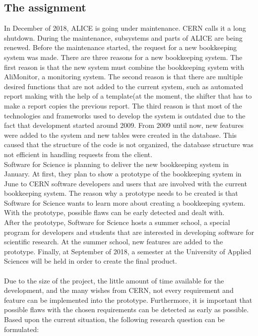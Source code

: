 \documentclass[paper=a4, fontsize=11pt,twoside]{scrartcl}	%
\begin{document}
\subsection{The assignment}
In December of 2018, ALICE is going under maintenance. CERN calls it a long shutdown. During the maintenance, subsystems and parts of ALICE are being renewed. Before the maintenance started, the request for a new bookkeeping system was made. There are three reasons for a new bookkeeping system. The first reason is that the new system must combine the bookkeeping system with AliMonitor, a monitoring system. The second reason is that there are multiple desired functions that are not added to the current system, such as automated report making with the help of a template(at the moment, the shifter that has to make a report copies the previous report. The third reason is that most of the technologies and frameworks used to develop the system is outdated due to the fact that development started around 2009. From 2009 until now, new features were added to the system and new tables were created in the database. This caused that the structure of the code is not organized, the database structure was not efficient in handling requests from the client. \\
Software for Science is planning to deliver the new bookkeeping system in January. At first, they plan to show a prototype of the bookkeeping system in June to CERN software developers and users that are involved with the current bookkeeping system. The reason why a prototype needs to be created is that Software for Science wants to learn more about creating a bookkeeping system. With the prototype, possible flaws can be early detected and dealt with. \\
After the prototype, Software for Science hosts a summer school, a special program for developers and students that are interested in developing software for scientific research. At the summer school, new features are added to the prototype. Finally, at September of 2018, a semester at the University of Applied Sciences will be held in order to create the final product. \\ \\ 
Due to the size of the project, the little amount of time available for the development, and the many wishes from CERN, 
not every requirement and feature can be implemented into the prototype. Furthermore, it is important that possible flaws with the chosen requirements can be detected as early as possible. Based upon the current situation, the following research question can be formulated: \\ \\
\end{document}
